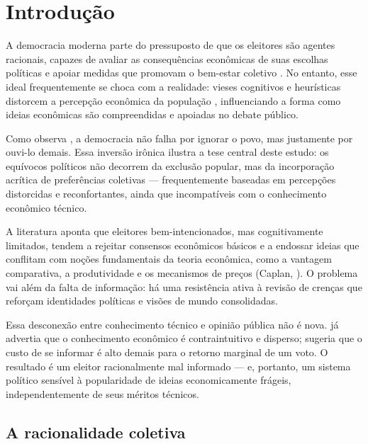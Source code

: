 

\chapter{Introdução} %

A democracia moderna parte do pressuposto de que os eleitores são agentes racionais, capazes de avaliar as consequências econômicas de suas escolhas políticas e apoiar medidas que promovam o bem-estar coletivo \cite{downs1957economic}. No entanto, esse ideal frequentemente se choca com a realidade: vieses cognitivos e heurísticas distorcem a percepção econômica da população \cite{The_Myth_of_the_Rational_Voter,kahneman2011thinking}, influenciando a forma como ideias econômicas são compreendidas e apoiadas no debate público.

Como observa , a democracia não falha por ignorar o povo, mas justamente por ouvi-lo demais. Essa inversão irônica ilustra a tese central deste estudo: os equívocos políticos não decorrem da exclusão popular, mas da incorporação acrítica de preferências coletivas — frequentemente baseadas em percepções distorcidas e reconfortantes, ainda que incompatíveis com o conhecimento econômico técnico.

A literatura aponta que eleitores bem-intencionados, mas cognitivamente limitados, tendem a rejeitar consensos econômicos básicos e a endossar ideias que conflitam com noções fundamentais da teoria econômica, como a vantagem comparativa, a produtividade e os mecanismos de preços (Caplan, \citeyear{Systematically_Biased_Beliefs_about_Economics,The_Myth_of_the_Rational_Voter}). O problema vai além da falta de informação: há uma resistência ativa à revisão de crenças que reforçam identidades políticas e visões de mundo consolidadas.

Essa desconexão entre conhecimento técnico e opinião pública não é nova.  já advertia que o conhecimento econômico é contraintuitivo e disperso;  sugeria que o custo de se informar é alto demais para o retorno marginal de um voto. O resultado é um eleitor racionalmente mal informado — e, portanto, um sistema político sensível à popularidade de ideias economicamente frágeis, independentemente de seus méritos técnicos.

\section{A racionalidade coletiva} %

